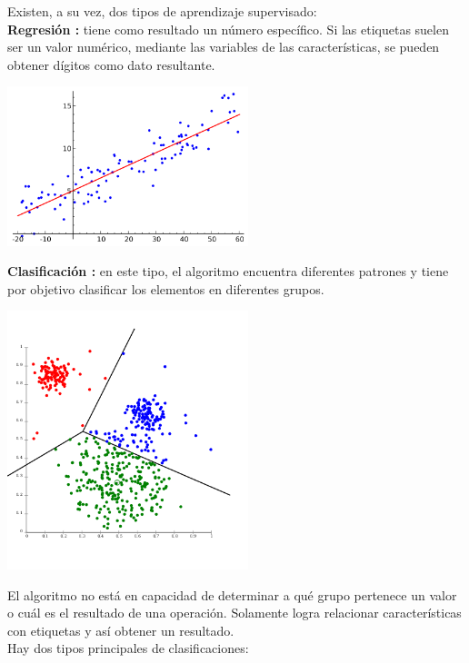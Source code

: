 \documentclass[%
 reprint,
 amsmath,amssymb,
 aps,
]{revtex4-1}
\begin{document}
Existen, a su vez, dos tipos de aprendizaje supervisado:\\
 \textbf{Regresión : }tiene como resultado un número específico. Si las etiquetas suelen ser un valor numérico, mediante las variables de las características, se pueden obtener dígitos como dato resultante.\\
 
 
\begin{center}
\includegraphics[width=7cm]{./Imagenes/regresion}
\end{center}
 
 \textbf{Clasificación : }en este tipo, el algoritmo encuentra diferentes patrones y tiene por objetivo clasificar los elementos en diferentes grupos.\\
 
 \begin{center}
\includegraphics[width=7cm]{./Imagenes/clasificacion}
\end{center}

El algoritmo no está en capacidad de determinar a qué grupo pertenece un valor o cuál es el resultado de una operación. Solamente logra relacionar características con etiquetas y así obtener un resultado.\\

Hay dos tipos principales de clasificaciones:\\
\end{document}
